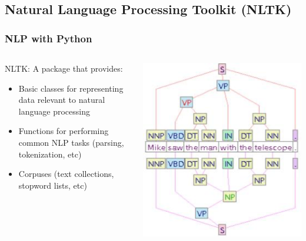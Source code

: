 \documentclass{beamer}
\begin{document}
\subsection{Natural Language Processing Toolkit (NLTK)}

\begin{frame}

\frametitle{NLP with Python}

	\begin{columns}
	
	\begin{column}{.5\textwidth}
	
	NLTK: A package that provides:
	
		\begin{itemize}
			
			\item Basic classes for representing data relevant to natural language processing
			
			\item Functions for performing common NLP tasks (parsing, tokenization, etc)
			
			\item Corpuses (text collections, stopword lists, etc)
			
		\end{itemize}
	\end{column}
	
	\begin{column}{.5\textwidth}
		\vspace{.2cm}			\centerline{\includegraphics[width=\textwidth]{./figs/NLPTM_NLTKgeneral.png}}
	\end{column}


\end{columns}
\end{frame}
\end{document}
